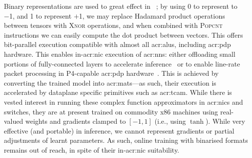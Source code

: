 Binary representations are used to great effect in ~\parencite{DBLP:journals/corr/MiyashitaLM16,DBLP:conf/eccv/RastegariORF16,DBLP:journals/corr/KimS16,DBLP:conf/nips/HubaraCSEB16}; by using 0 to represent to \num{-1}, and 1 to represent $+$\num{1}, we may replace Hadamard product operations between tensors with \textsc{Xnor} operations, and when combined with \textsc{Popcnt} instructions we can easily compute the dot product between vectors.
This offers bit-parallel execution compatible with almost all \glspl{acr:alu}, including \gls{acr:pdp} hardware.
This enables in-\gls{acr:nic} execution of \glspl{acr:nn}: either offloading small portions of fully-connected layers to accelerate inference~\parencite{DBLP:conf/sigcomm/SanvitoSB18} or to enable line-rate packet processing in P4-capable \gls{acr:pdp} hardware~\parencite{DBLP:journals/corr/abs-2009-02353,DBLP:journals/corr/abs-1801-05731}.
This is achieved by converting the trained model into \glspl{acr:mat}---as such, their execution is accelerated by dataplane specific primitives such as \gls{acr:tcam}.
While there is vested interest in running these complex function approximators in \glspl{acr:nic} and switches, they are at present trained on commodity x86 machines using real-valued weights and gradients clamped to $\left[-1, 1\right]$ (i.e., using $\tanh$).
While very effective (and portable) in inference, we cannot represent gradients or partial adjustments of learnt parameters.
As such, online training with binarised formats remains out of reach, in spite of their in-\gls{acr:nic} suitability.